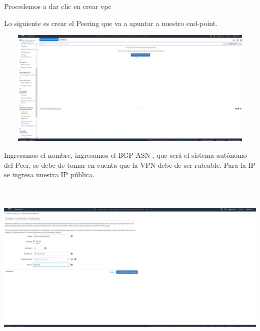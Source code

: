 \documentclass{article} %
\begin{document}
\noindent 

\noindent Procedemos a dar clic en crear vpc

\noindent 

\noindent Lo siguiente es crear el Peering que va a apuntar a nuestro end-point. 

\noindent 

\noindent \includegraphics*[width=6.66in, height=2.21in, trim=0.00in 2.20in 2.93in 0.14in]{image3}

\noindent 

\noindent 

\noindent 

\noindent 

\noindent Ingresamos el nombre, ingresamos el BGP ASN , que ser\'{a} el sistema aut\'{o}nomo del Peer, se debe de tomar en cuenta que la VPN debe de ser ruteable. Para la IP se ingresa nuestra IP p\'{u}blica. 

\noindent 

\noindent 

\noindent \includegraphics*[width=6.74in, height=3.38in, trim=0.00in 2.36in 5.55in 0.00in]{image4}

\noindent 
\end{document}
